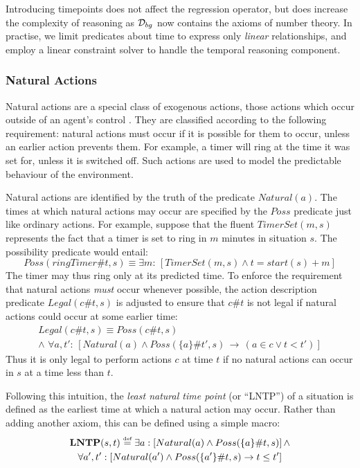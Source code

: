Introducing timepoints does not affect the regression operator, but
does increase the complexity of reasoning as $\mathcal{D}_{bg}$ now contains
the axioms of number theory. In practise, we limit predicates about
time to express only \emph{linear} relationships, and employ a linear
constraint solver to handle the temporal reasoning component.


\subsubsection{Natural Actions\label{sub:Background:Natural-Actions}}

Natural actions are a special class of exogenous actions, those actions
which occur outside of an agent's control \citep{reiter96sc_nat_conc}.
They are classified according to the following requirement: natural
actions must occur if it is possible for them to occur, unless an
earlier action prevents them. For example, a timer will ring at the
time it was set for, unless it is switched off. Such actions are used
to model the predictable behaviour of the environment.

Natural actions are identified by the truth of the predicate $Natural(a)$.
The times at which natural actions may occur are specified by the
$Poss$ predicate just like ordinary actions. For example, suppose
that the fluent $TimerSet(m,s)$ represents the fact that a timer
is set to ring in $m$ minutes in situation $s$. The possibility
predicate would entail:\[
Poss(ringTimer\#t,s)\equiv\exists m:\,\left[TimerSet(m,s)\wedge t=start(s)+m\right]\]
 The timer may thus ring only at its predicted time. To enforce the
requirement that natural actions \emph{must} occur whenever possible,
the action description predicate $Legal(c\#t,s)$ is adjusted to ensure
that $c\#t$ is not legal if natural actions could occur at some earlier
time:\begin{multline*}
Legal(c\#t,s)\equiv Poss(c\#t,s)\\
\wedge\,\,\forall a,t':\,\left[Natural(a)\wedge Poss(\{a\}\#t',s)\,\rightarrow\,\left(a\in c\vee t<t'\right)\right]\end{multline*}
 Thus it is only legal to perform actions $c$ at time $t$ if no
natural actions can occur in $s$ at a time less than $t$.

Following this intuition, the \emph{least natural time point} (or
{}``LNTP'') of a situation is defined as the earliest time at which
a natural action may occur. Rather than adding another axiom, this
can be defined using a simple macro: \begin{multline*}
\mathbf{LNTP}(s,t)\stackrel{\mbox{\tiny def}}{=}\exists a:\left[Natural(a)\wedge Poss(\{a\}\#t,s)\right]\wedge\\
\forall a',t':\left[Natural(a')\wedge Poss(\{a'\}\#t,s)\rightarrow t\leq t'\right]\end{multline*}


